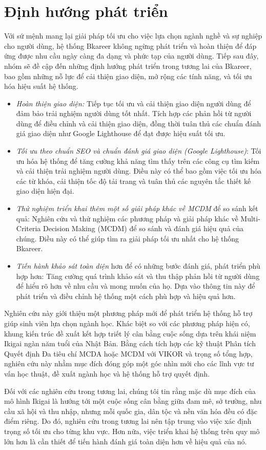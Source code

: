 \section{Định hướng phát triển}
   Với sứ mệnh mang lại giải pháp tối ưu cho việc lựa chọn ngành nghề và sự nghiệp cho người dùng, hệ thống Bkareer không ngừng phát triển và hoàn thiện để đáp ứng được nhu cầu ngày càng đa dạng và phức tạp của người dùng. Tiếp sau đây, nhóm sẽ đề cập đến những định hướng phát triển trong tương lai của Bkareer, bao gồm những nỗ lực để cải thiện giao diện, mở rộng các tính năng, và tối ưu hóa hiệu suất hệ thống. 
   \begin{itemize}
       \item \textit{Hoàn thiện giao diện:} Tiếp tục tối ưu và cải thiện giao diện người dùng để đảm bảo trải nghiệm người dùng tốt nhất. Tích hợp các phản hồi từ người dùng để điều chỉnh và cải thiện giao diện, đồng thời tuân thủ các chuẩn đánh giá giao diện như Google Lighthouse để đạt được hiệu suất tối ưu.
       \item \textit{Tối ưu theo chuẩn SEO và chuẩn đánh giá giao diện (Google Lighthouse)}: Tối ưu hóa hệ thống để tăng cường khả năng tìm thấy trên các công cụ tìm kiếm và cải thiện trải nghiệm người dùng. Điều này có thể bao gồm việc tối ưu hóa các từ khóa, cải thiện tốc độ tải trang và tuân thủ các nguyên tắc thiết kế giao diện hiện đại.
       \item \textit{Thử nghiệm triển khai thêm một số giải pháp khác về MCDM} để so sánh kết quả: Nghiên cứu và thử nghiệm các phương pháp và giải pháp khác về Multi-Criteria Decision Making (MCDM) để so sánh và đánh giá hiệu quả của chúng. Điều này có thể giúp tìm ra giải pháp tối ưu nhất cho hệ thống Bkareer.
       \item \textit{Tiến hành khảo sát toàn diện} hơn để có những bước đánh giá, phát triển phù hợp hơn: Tăng cường quá trình khảo sát và thu thập phản hồi từ người dùng để hiểu rõ hơn về nhu cầu và mong muốn của họ. Dựa vào thông tin này để phát triển và điều chỉnh hệ thống một cách phù hợp và hiệu quả hơn.
   \end{itemize}

Nghiên cứu này giới thiệu một phương pháp mới để phát triển hệ thống hỗ trợ giúp sinh viên lựa chọn ngành học. Khác biệt so với các phương pháp hiện có, khung kiến trúc đề xuất kết hợp triết lý cân bằng cuộc sống dựa trên khái niệm Ikigai ngàn năm tuổi của Nhật Bản. Bằng cách tích hợp các kỹ thuật Phân tích Quyết định Đa tiêu chí MCDA hoặc MCDM với VIKOR và trọng số tổng hợp, nghiên cứu này nhằm mục đích đóng góp một góc nhìn mới cho các lĩnh vực tư vấn học thuật, đề xuất ngành học và hệ thống hỗ trợ quyết định.

Đối với các nghiên cứu trong tương lai, chúng tôi tin rằng mặc dù mục đích của mô hình Ikigai là hướng tới một cuộc sống cân bằng giữa đam mê, sở trường, nhu cầu xã hội và thu nhập, nhưng mỗi quốc gia, dân tộc và nền văn hóa đều có đặc điểm riêng. Do đó, nghiên cứu trong tương lai nên tập trung vào việc xác định trọng số tối ưu cho từng khu vực. Hơn nữa, việc triển khai hệ thống trên quy mô lớn hơn là cần thiết để tiến hành đánh giá toàn diện hơn về hiệu quả của nó.